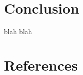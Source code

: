 \documentclass[review]{elsarticle}
\begin{document}

\section{Conclusion}

blah blah



\section*{References}


\end{document}

